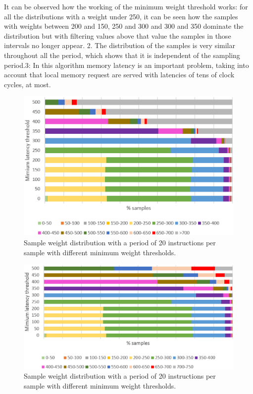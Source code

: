 It can be observed how the working of the minimum weight threshold works: for all the distributions with a weight under 250, it can be seen how the samples with weights between 200 and 150, 250 and 300 and 300 and 350 dominate the distribution but with filtering values above that value the samples in those intervals no longer appear. 2.	The distribution of the samples is very similar throughout all the period, which shows that it is independent of the sampling period.3:	In this algorithm memory latency is an important problem, taking into account that local memory request are served with latencies of tens of clock cycles, at most.

\begin{figure}[th]
	\centering
		\includegraphics[width=.8\textwidth]{figures/latencydistw20.eps}
		\caption[Sample weight distribution with a period of 20 instructions per sample.]{Sample weight distribution with a period of 20 instructions per sample with different minimum weight thresholds. }
		\label{fig:latencydistw20}
\end{figure}

\begin{figure}[th]
	\centering
		\includegraphics[width=.8\textwidth]{figures/latencydistw200.eps}
		\caption[Sample weight distribution with a period of 200 instructions per sample.]{Sample weight distribution with a period of 20 instructions per sample with different minimum weight thresholds.}
		\label{fig:latencydistw200}
\end{figure}

